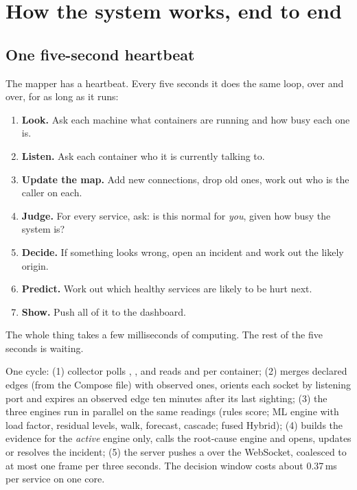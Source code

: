 \chapter{How the system works, end to end}
\label{ch:system}

\section{One five-second heartbeat}
\begin{simplebox}
The mapper has a heartbeat. Every five seconds it does the same loop, over and over, for as long as it runs:

\begin{enumerate}
\item \textbf{Look.} Ask each machine what containers are running and how busy each one is.
\item \textbf{Listen.} Ask each container who it is currently talking to.
\item \textbf{Update the map.} Add new connections, drop old ones, work out who is the caller on each.
\item \textbf{Judge.} For every service, ask: is this normal for \emph{you}, given how busy the system is?
\item \textbf{Decide.} If something looks wrong, open an incident and work out the likely origin.
\item \textbf{Predict.} Work out which healthy services are likely to be hurt next.
\item \textbf{Show.} Push all of it to the dashboard.
\end{enumerate}

The whole thing takes a few milliseconds of computing. The rest of the five seconds is waiting.
\end{simplebox}

\begin{techbox}
One cycle: (1) collector polls , ,  and reads  and  per container; (2)  merges declared edges (from the Compose file) with observed ones, orients each socket by listening port and expires an observed edge ten minutes after its last sighting; (3) the three engines run in parallel on the same readings (rules score; ML engine with load factor, residual levels, walk, forecast, cascade; fused Hybrid); (4)  builds the evidence for the \emph{active} engine only, calls the root-cause engine and opens, updates or resolves the incident; (5) the server pushes a  over the WebSocket, coalesced to at most one frame per three seconds. The decision window costs about 0.37\,ms per service on one core.
\end{techbox}

